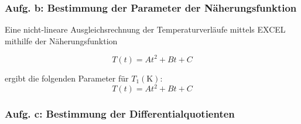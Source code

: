 

\subsubsection{Aufg. b: Bestimmung der Parameter der Näherungsfunktion}

Eine nicht-lineare Ausgleichsrechnung der Temperaturverläufe mittels EXCEL mithilfe der Näherungsfunktion

\begin{equation} 
  T(t) = At^2 + Bt + C 
\end{equation}

ergibt die folgenden Parameter für $T_{1} (\unit{\kelvin})$:
\begin{equation} 
  T(t) = At^2 + Bt + C 
\end{equation}


\subsubsection{Aufg. c: Bestimmung der Differentialquotienten}

